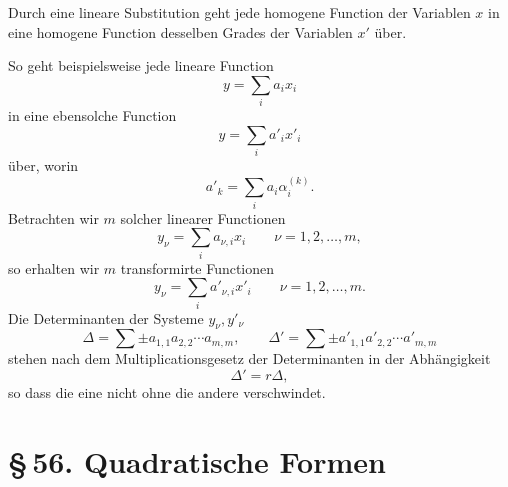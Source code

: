 \documentclass[11pt]{article}
\providecommand{\sect}[2]{\section*{\S\,#1. #2}}
\begin{document}
Durch eine lineare Substitution geht jede homogene Function der Variablen $x$ in eine homogene Function desselben Grades der Variablen $x'$ über.

So geht beispielsweise jede lineare Function
\[
 y=\sum_i a_i x_i
\]
in eine ebensolche Function
\[
 y=\sum_i a'_i x'_i
\]
über, worin
\begin{equation}
 a'_k=\sum_i a_i\alpha_i^{(k)}.
\tag{3}
\end{equation}
Betrachten wir $m$ solcher linearer Functionen
\[
 y_\nu=\sum_i a_{\nu,i}x_i\qquad \nu=1,2,\ldots,m,
\]
so erhalten wir $m$ transformirte Functionen
\[
 y_\nu=\sum_i a'_{\nu,i}x'_i\qquad \nu=1,2,\ldots,m.
\]
Die Determinanten der Systeme $y_\nu,y'_\nu$
\[
 \Delta=\sum \pm a_{1,1}a_{2,2}\cdots a_{m,m},
 \qquad
 \Delta'=\sum \pm a'_{1,1}a'_{2,2}\cdots a'_{m,m}
\]
stehen nach dem Multiplicationsgesetz der Determinanten in der Abhängigkeit
\begin{equation}
 \Delta'=r\Delta,
\tag{4}
\end{equation}
so dass die eine nicht ohne die andere verschwindet.

\sect{56}{Quadratische Formen}
\end{document}
